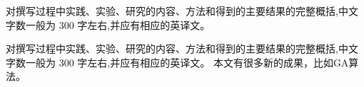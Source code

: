 ﻿\begin{cabstract}
对撰写过程中实践、实验、研究的内容、方法和得到的主要结果的完整概括,中文字数一般为 300 字左右,并应有相应的英译文。
\end{cabstract}

\begin{eabstract}
对撰写过程中实践、实验、研究的内容、方法和得到的主要结果的完整概括,中文字数一般为 300 字左右,并应有相应的英译文。
本文有很多新的成果，比如GA算法。
\end{eabstract}
